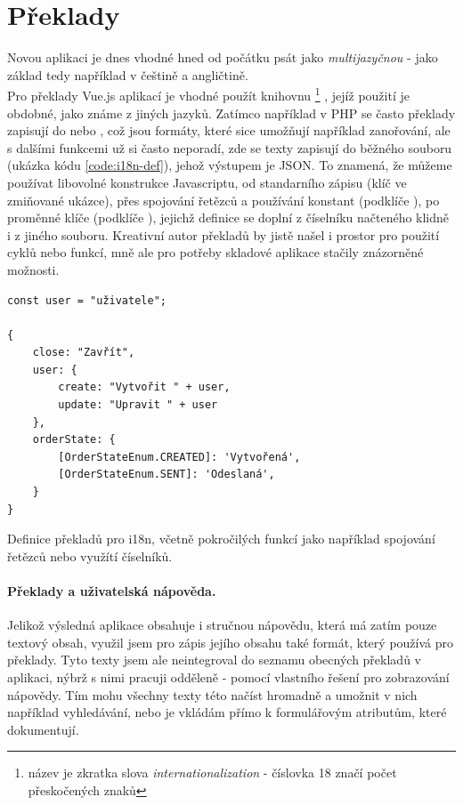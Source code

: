 
\section{Překlady}

Novou aplikaci je dnes vhodné hned od počátku psát jako \emph{multijazyčnou} - jako základ tedy například v češtině a angličtině.\\
Pro překlady Vue.js aplikací je vhodné použít knihovnu \footnote{název je zkratka slova \emph{internationalization} - číslovka 18 značí počet přeskočených znaků} \cite{vue-i18n}, jejíž použití je obdobné, jako známe z jiných jazyků. Zatímco například v PHP se často překlady zapisují do  nebo , což jsou formáty, které sice umožňují například zanořování, ale s dalšími funkcemi už si často neporadí, zde se texty zapisují do běžného  souboru (ukázka kódu \ref{code:i18n-def}), jehož výstupem je JSON. To znamená, že můžeme používat libovolné konstrukce Javascriptu, od standarního zápisu (klíč  ve zmiňované ukázce), přes spojování řetězců a používání konstant (podklíče ), po proměnné klíče (podklíče ), jejichž definice se doplní z číselníku načteného klidně i z jiného souboru. Kreativní autor překladů by jistě našel i prostor pro použití cyklů nebo funkcí, mně ale pro potřeby skladové aplikace stačily znázorněné možnosti.

\begin{listing}[h]
\begin{verbatim}
const user = "uživatele";

{
    close: "Zavřít",
    user: {
        create: "Vytvořit " + user,
        update: "Upravit " + user
    },
    orderState: {
        [OrderStateEnum.CREATED]: 'Vytvořená',
        [OrderStateEnum.SENT]: 'Odeslaná',
    }
}
\end{verbatim}
\caption[Definice překladů pro i18n]{Definice překladů pro i18n, včetně pokročilých funkcí jako například spojování řetězců nebo využítí číselníků.} \label{code:i18n-def}
\end{listing}

\paragraph{Překlady a uživatelská nápověda.} Jelikož výsledná aplikace obsahuje i stručnou nápovědu, která má zatím pouze textový obsah, využil jsem pro zápis jejího obsahu také formát, který používá  pro překlady. Tyto texty jsem ale neintegroval do seznamu obecných překladů v aplikaci, nýbrž s nimi pracuji odděleně - pomocí vlastního řešení pro zobrazování nápovědy. Tím mohu všechny texty této  načíst hromadně a umožnit v nich například vyhledávání, nebo je vkládám přímo k formulářovým atributům, které dokumentují.

